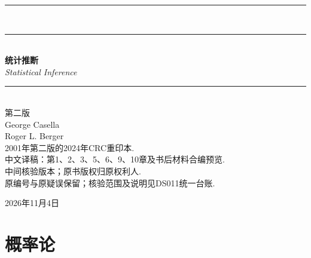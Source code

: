 \documentclass[UTF8,12pt]{ctexart}
\theoremstyle{plain}
\numberwithin{equation}{subsection}
\numberwithin{figure}{subsection}
\numberwithin{table}{subsection}
\newif\ifInAppendix
\newif\ifInAppendixToc
\let\OriginalAppendix\appendix
\renewcommand{\appendix}{%
  \OriginalAppendix
  \InAppendixtrue
  \addtocontents{toc}{\protect\InAppendixToctrue}%
}
\begin{document}
\hypersetup{pageanchor=false}
\begin{titlepage}
\noindent\rule{\textwidth}{1.2pt}\\[0.1cm]\rule{\textwidth}{.8pt}\\[1.4cm]
{\fontsize{40pt}{52pt}\selectfont\bfseries 统计推断}\\[.8cm]
{\fontsize{22pt}{30pt}\selectfont\textit{Statistical Inference}}\\[1cm]
\rule{\textwidth}{.6pt}\\[1cm]
{\Large 第二版}\\[1cm]
{\large George Casella\\[.15cm]Roger L. Berger}\\[1.2cm]
{\small 2001年第二版的2024年CRC重印本.\\
中文译稿：第1、2、3、5、6、9、10章及书后材料合编预览.\\
中间核验版本；原书版权归原权利人.\\
原编号与原疑误保留；核验范围及说明见DS011统一台账.}
\vfill\begin{flushright}\small 2026年11月4日\end{flushright}
\end{titlepage}
\hypersetup{pageanchor=true}








\clearpage\renewcommand{\contentsname}{本册译稿目录}\tableofcontents\clearpage
{}
\section{概率论}\label{sec:1}










\setcounter{section}{1}


\setcounter{section}{2}


\setcounter{section}{4}


\setcounter{section}{5}


\setcounter{section}{8}


\setcounter{section}{9}


\appendix




\end{document}
